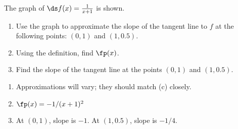 {The graph of $\ds f(x)=\frac{1}{x+1}$ is shown. 
	\begin{enumerate}
	\item		Use the graph to approximate the slope of the tangent line to $f$ at the following points: $(0,1)$ and $(1,0.5)$. 
	\item		Using the definition, find $\fp(x)$.
	\item		Find the slope of the tangent line at the points $(0,1)$ and $(1,0.5)$.
	\end{enumerate}
}
{\begin{enumerate}
\item	Approximations will vary; they should match (c) closely.
\item		$\fp(x) = -1/(x+1)^2$
\item		At $(0,1)$, slope is $-1$. At $(1,0.5)$, slope is $-1/4$.
\end{enumerate}
}
